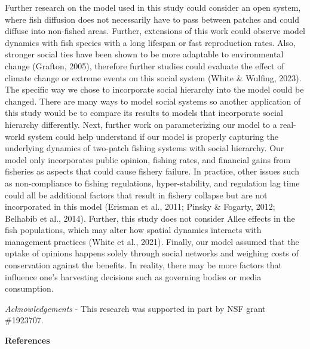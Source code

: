 \documentclass[
  12pt,
]{article}
\begin{document}
Further research on the model used in this study could consider an open system, where fish diffusion does not necessarily have to pass between patches and could diffuse into non-fished areas. Further, extensions of this work could observe model dynamics with fish species with a long lifespan or fast reproduction rates. Also, stronger social ties have been shown to be more adaptable to environmental change (Grafton, 2005), therefore further studies could evaluate the effect of climate change or extreme events on this social system (White \& Wulfing, 2023). The specific way we chose to incorporate social hierarchy into the model could be changed. There are many ways to model social systems so another application of this study would be to compare its results to models that incorporate social hierarchy differently. Next, further work on parameterizing our model to a real-world system could help understand if our model is properly capturing the underlying dynamics of two-patch fishing systems with social hierarchy. Our model only incorporates public opinion, fishing rates, and financial gains from fisheries as aspects that could cause fishery failure. In practice, other issues such as non-compliance to fishing regulations, hyper-stability, and regulation lag time could all be additional factors that result in fishery collapse but are not incorporated in this model (Erisman et al., 2011; Pinsky \& Fogarty, 2012; Belhabib et al., 2014). Further, this study does not consider Allee effects in the fish populations, which may alter how spatial dynamics interacts with management practices (White et al., 2021). Finally, our model assumed that the uptake of opinions happens solely through social networks and weighing costs of conservation against the benefits. In reality, there may be more factors that influence one's harvesting decisions such as governing bodies or media consumption.

\emph{Acknowledgements} - This research was supported in part by NSF grant \#1923707.

\newpage

\textbf{References}
\end{document}
